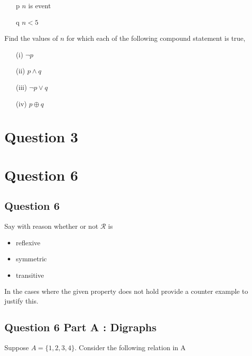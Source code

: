 \documentclass[]{report}
\begin{document}
\begin{enumerate}
\begin{itemize}
\item[p] $n$ is event
\item[q] $n<5$
\end{itemize}

Find the values of $n$ for which each of the following compound statement is true,

\begin{itemize}
\item[(i)] $\neg p$
\item[(ii)] $p \wedge q$
\item[(iii)] $\neg p \vee q$ 
\item[(iv)] $p \oplus q$
\end{itemize}

\newpage
\section*{Question 3}





\section*{Question 6}

\subsection{Question 6}
Say with reason whether or not $\mathcal{R}$ is
\begin{itemize}
\item reflexive
\item symmetric
\item transitive
\end{itemize}

In the cases where the given property does not hold provide a counter example to justify this.


\subsection*{Question 6 Part A : Digraphs}

Suppose $A = $$\{1,2,3,4\}$. Consider the following relation in A


\end{enumerate}
\end{document}
